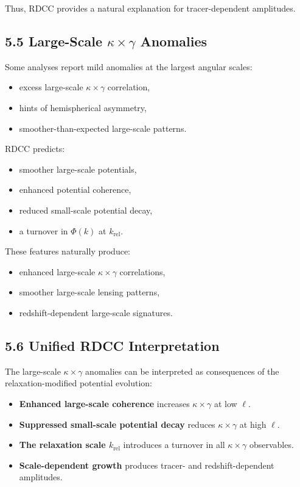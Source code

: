 \documentclass[11pt,a4paper]{article}
\begin{document}
Thus, RDCC provides a natural explanation for tracer-dependent amplitudes.

\subsection*{5.5 Large-Scale $\kappa \times \gamma$ Anomalies}

Some analyses report mild anomalies at the largest angular scales:

\begin{itemize}
    \item excess large-scale $\kappa \times \gamma$ correlation,
    \item hints of hemispherical asymmetry,
    \item smoother-than-expected large-scale patterns.
\end{itemize}

RDCC predicts:

\begin{itemize}
    \item smoother large-scale potentials,
    \item enhanced potential coherence,
    \item reduced small-scale potential decay,
    \item a turnover in $\Phi(k)$ at $k_{\mathrm{rel}}$.
\end{itemize}

These features naturally produce:

\begin{itemize}
    \item enhanced large-scale $\kappa \times \gamma$ correlations,
    \item smoother large-scale lensing patterns,
    \item redshift-dependent large-scale signatures.
\end{itemize}

\subsection*{5.6 Unified RDCC Interpretation}

The large-scale $\kappa \times \gamma$ anomalies can be interpreted as consequences of the 
relaxation-modified potential evolution:

\begin{itemize}
    \item \textbf{Enhanced large-scale coherence} increases $\kappa \times \gamma$ at low $\ell$.
    \item \textbf{Suppressed small-scale potential decay} reduces $\kappa \times \gamma$ at high $\ell$.
    \item \textbf{The relaxation scale $k_{\mathrm{rel}}$} introduces a turnover in all 
          $\kappa \times \gamma$ observables.
    \item \textbf{Scale-dependent growth} produces tracer- and redshift-dependent amplitudes.
\end{itemize}
\end{document}
